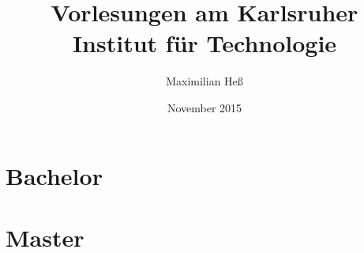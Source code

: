 \documentclass[a4paper,11pt,titlepage]{scrbook}
\title{Vorlesungen am Karlsruher Institut für Technologie}
\author{Maximilian Heß}
\date{November 2015}
\begin{document}
\maketitle
\tableofcontents

\part{Bachelor}










\part{Master}

\end{document}
